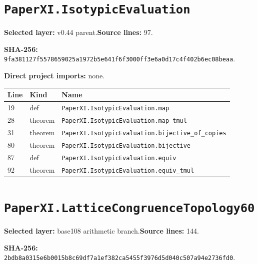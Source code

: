 \documentclass[10pt,oneside]{book}
\begin{document}
\section{\texorpdfstring{\nolinkurl{PaperXI.IsotypicEvaluation}}{PaperXI.IsotypicEvaluation}}\label{module:PaperXI.IsotypicEvaluation}

\textbf{Selected layer:} v0.44 parent.\quad\textbf{Source lines:} 97.\par\textbf{SHA-256:} {\scriptsize\nolinkurl{9fa381127f5578659025a1972b5e641f6f3000ff3e6a0d17c4f402b6ec08beaa}}.

\textbf{Direct project imports:} none.

\begin{longtable}{@{}p{}p{}p{}@{}}\toprule Line&Kind&Name\\\midrule\endhead

19&def&\nolinkurl{PaperXI.IsotypicEvaluation.map}\\

28&theorem&\nolinkurl{PaperXI.IsotypicEvaluation.map_tmul}\\

31&theorem&\nolinkurl{PaperXI.IsotypicEvaluation.bijective_of_copies}\\

80&theorem&\nolinkurl{PaperXI.IsotypicEvaluation.bijective}\\

87&def&\nolinkurl{PaperXI.IsotypicEvaluation.equiv}\\

92&theorem&\nolinkurl{PaperXI.IsotypicEvaluation.equiv_tmul}\\

\bottomrule\end{longtable}

\section{\texorpdfstring{\nolinkurl{PaperXI.LatticeCongruenceTopology60}}{PaperXI.LatticeCongruenceTopology60}}\label{module:PaperXI.LatticeCongruenceTopology60}

\textbf{Selected layer:} base108 arithmetic branch.\quad\textbf{Source lines:} 144.\par\textbf{SHA-256:} {\scriptsize\nolinkurl{2bdb8a0315e6b0015b8c69df7a1ef382ca5455f3976d5d040c507a94e2736fd0}}.

\end{document}
